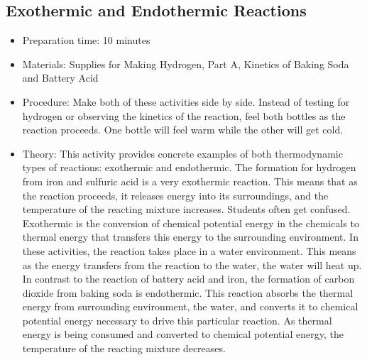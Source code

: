 \subsection{Exothermic and Endothermic Reactions}
\begin{itemize}
\item{Preparation time: 10 minutes}
\item{Materials: Supplies for Making Hydrogen, Part A, Kinetics of Baking Soda and Battery Acid}
\item{Procedure: Make both of these activities side by side. Instead of testing for hydrogen or observing the kinetics of the reaction, feel both bottles as the reaction proceeds. One bottle will feel warm while the other will get cold.}
\item{Theory: This activity provides concrete examples of both thermodynamic types of reactions: exothermic and endothermic. The formation for hydrogen from iron and sulfuric acid is a very exothermic reaction. This means that as the reaction proceeds, it releases energy into its surroundings, and the temperature of the reacting mixture increases. Students often get confused. Exothermic is the conversion of chemical potential energy in the chemicals to thermal energy that transfers this energy to the surrounding environment. In these activities, the reaction takes place in a water environment. This means as the energy transfers from the reaction to the water, the water will heat up. In contrast to the reaction of battery acid and iron, the formation of carbon dioxide from baking soda is endothermic. This reaction absorbs the thermal energy from surrounding environment, the water, and converts it to chemical potential energy necessary to drive this particular reaction. As thermal energy is being consumed and converted to chemical potential energy, the temperature of the reacting mixture decreases.}
\end{itemize}

